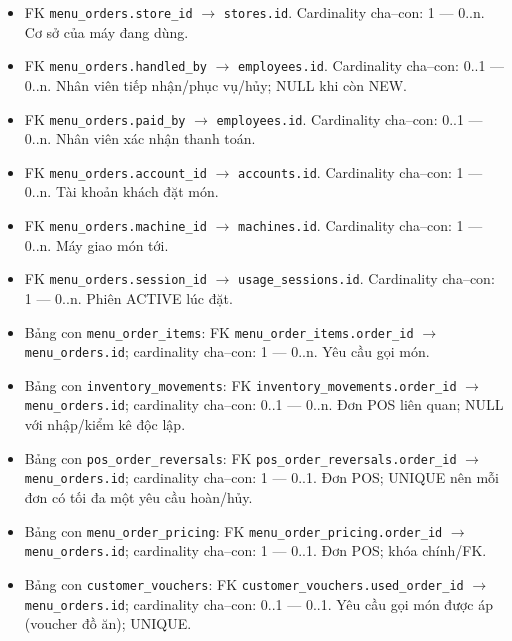 \begin{itemize}

\item FK \texttt{menu\_orders.store\_id} $\rightarrow$ \texttt{stores.id}. Cardinality cha--con: 1 — 0..n. Cơ sở của máy đang dùng.

\item FK \texttt{menu\_orders.handled\_by} $\rightarrow$ \texttt{employees.id}. Cardinality cha--con: 0..1 — 0..n. Nhân viên tiếp nhận/phục vụ/hủy; NULL khi còn NEW.

\item FK \texttt{menu\_orders.paid\_by} $\rightarrow$ \texttt{employees.id}. Cardinality cha--con: 0..1 — 0..n. Nhân viên xác nhận thanh toán.

\item FK \texttt{menu\_orders.account\_id} $\rightarrow$ \texttt{accounts.id}. Cardinality cha--con: 1 — 0..n. Tài khoản khách đặt món.

\item FK \texttt{menu\_orders.machine\_id} $\rightarrow$ \texttt{machines.id}. Cardinality cha--con: 1 — 0..n. Máy giao món tới.

\item FK \texttt{menu\_orders.session\_id} $\rightarrow$ \texttt{usage\_sessions.id}. Cardinality cha--con: 1 — 0..n. Phiên ACTIVE lúc đặt.

\item Bảng con \texttt{menu\_order\_items}: FK \texttt{menu\_order\_items.order\_id} $\rightarrow$ \texttt{menu\_orders.id}; cardinality cha--con: 1 — 0..n. Yêu cầu gọi món.

\item Bảng con \texttt{inventory\_movements}: FK \texttt{inventory\_movements.order\_id} $\rightarrow$ \texttt{menu\_orders.id}; cardinality cha--con: 0..1 — 0..n. Đơn POS liên quan; NULL với nhập/kiểm kê độc lập.

\item Bảng con \texttt{pos\_order\_reversals}: FK \texttt{pos\_order\_reversals.order\_id} $\rightarrow$ \texttt{menu\_orders.id}; cardinality cha--con: 1 — 0..1. Đơn POS; UNIQUE nên mỗi đơn có tối đa một yêu cầu hoàn/hủy.

\item Bảng con \texttt{menu\_order\_pricing}: FK \texttt{menu\_order\_pricing.order\_id} $\rightarrow$ \texttt{menu\_orders.id}; cardinality cha--con: 1 — 0..1. Đơn POS; khóa chính/FK.

\item Bảng con \texttt{customer\_vouchers}: FK \texttt{customer\_vouchers.used\_order\_id} $\rightarrow$ \texttt{menu\_orders.id}; cardinality cha--con: 0..1 — 0..1. Yêu cầu gọi món được áp (voucher đồ ăn); UNIQUE.

\end{itemize}

